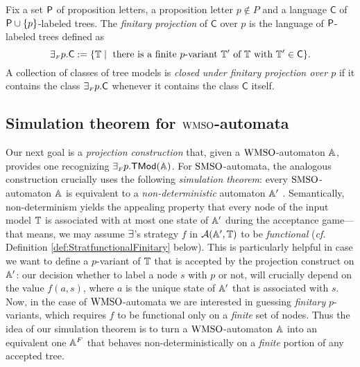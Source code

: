 \begin{definition}\label{def:tree_finproj-w}
Fix a set $\mathsf{P}$ of proposition letters, a proposition letter $p \not\in P$ 
and a language $\mathsf{C}$ of $\mathsf{P}\cup\{p\}$-labeled trees.
The \emph{finitary projection} of $\mathsf{C}$ over $p$ is the language of 
$\mathsf{P}$-labeled trees defined as 
\[
{\finexists} p.\mathsf{C} \df \{\bbT \mid
\text{ there is a finite $p$-variant } \bbT' \text{ of } \bbT \text{ with }
\bbT' \in \mathsf{C}\}.
\]
%
A collection of classes of tree models is \emph{closed under finitary 
projection over $p$} if it contains the class ${{\exists_{{\scriptscriptstyle F}}} p}.\mathsf{C}$ 
whenever it contains the class $\mathsf{C}$ itself.
\end{definition}

\subsection{Simulation theorem for $\mathrm{WMSO}$-automata}
\label{sec:simulationwmso}

\noindent
Our next goal is a \emph{projection construction} that, given a $\mathrm{WMSO}$-automaton
$\mathbb{A}$, provides one recognizing ${\exists_{{\scriptscriptstyle F}} p}.\mathsf{TMod}(\mathbb{A})$.
For $\mathrm{SMSO}$-automata, the analogous construction crucially uses the following
\emph{simulation theorem}: every $\mathrm{SMSO}$-automaton $\mathbb{A}$ is equivalent to a
\emph{non-deterministic} automaton $\mathbb{A}'$ \cite{Walukiewicz96}.
Semantically, non-determinism yields the appealing property that every node of
the input model $\mathbb{T}$ is associated with at most one state of $\mathbb{A}'$ during
the acceptance game--- that means, we may assume $\exists$'s strategy $f$ in
$\mathcal{A}(\mathbb{A}',\mathbb{T})$ to be \emph{functional} (\emph{cf.}
Definition \ref{def:StratfunctionalFinitary} below).
This is particularly helpful in case we want to define a $p$-variant of $\mathbb{T}$
that is accepted by the projection construct on $\mathbb{A}'$: our decision whether
to label a node $s$ with $p$ or not, will crucially depend on the value
$f(a,s)$, where $a$ is the unique state of $\mathbb{A}'$ that is associated with $s$.
Now, in the case of $\mathrm{WMSO}$-automata we are interested in guessing
\emph{finitary} $p$-variants, which requires $f$ to be functional only on a
\emph{finite} set of nodes.
Thus the idea of our simulation theorem is to turn a $\mathrm{WMSO}$-automaton $\mathbb{A}$
into an equivalent one $\mathbb{A}^{F}$ that behaves non-deterministically on a
\emph{finite} portion of any accepted tree.

